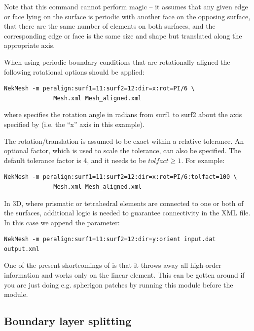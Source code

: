 Note that this command cannot perform magic -- it assumes that any given edge or
face lying on the surface is periodic with another face on the opposing surface,
that there are the same number of elements on both surfaces, and the
corresponding edge or face is the same size and shape but translated along the
appropriate axis.


When using periodic boundary conditions that are rotationally aligned the
following rotational options should be applied:
%
\begin{lstlisting}[style=BashInputStyle]
NekMesh -m peralign:surf1=11:surf2=12:dir=x:rot=PI/6 \
              Mesh.xml Mesh_aligned.xml
\end{lstlisting}
%
where  specifies the rotation angle in radians from
surf1 to surf2 about the axis specified by  (i.e. the ``x'' axis in
this example).

The rotation/translation is assumed to be exact within a relative tolerance.
An optional factor, which is used to scale the tolerance, \inltt{tolfact}
can also be specified. The default tolerance factor is 4, and it needs to be
$tolfact \ge 1$. For example:
%
\begin{lstlisting}[style=BashInputStyle]
NekMesh -m peralign:surf1=11:surf2=12:dir=x:rot=PI/6:tolfact=100 \
              Mesh.xml Mesh_aligned.xml
\end{lstlisting}
%

In 3D, where prismatic or tetrahedral elements are connected to one or both of
the surfaces, additional logic is needed to guarantee connectivity in the XML
file. In this case we append the \inltt{orient} parameter:
%
\begin{lstlisting}[style=BashInputStyle]
NekMesh -m peralign:surf1=11:surf2=12:dir=y:orient input.dat output.xml
\end{lstlisting}

\begin{notebox}
  One of the present shortcomings of  is that it throws away all
  high-order information and works only on the linear element. This can be
  gotten around if you are just doing e.g. spherigon patches by running this
  \inltt{peralign} module before the \inltt{spherigon} module.
\end{notebox}

\subsection{Boundary layer splitting}

